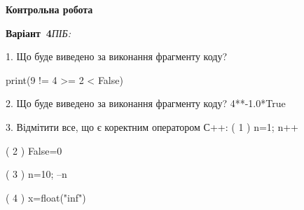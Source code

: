 \documentclass[11pt]{article}
\begin{document}
{\large\textbf{Контрольна робота}}

\textbf{Варіант \No\,4}\hfill \textit{ПІБ:}\,\underline{\hspace{60mm}}
\vspace{4mm}

1. Що буде виведено за виконання фрагменту коду?

print(9 != 4 >= 2 < False)


2. Що буде виведено за виконання фрагменту коду?
4**-1.0*True

3. Відмітити все, що є коректним оператором С++:
( 1 ) n=1; n++

( 2 ) False=0

( 3 ) n=10; --n

( 4 ) x=float("inf")


\newpage
\end{document}
